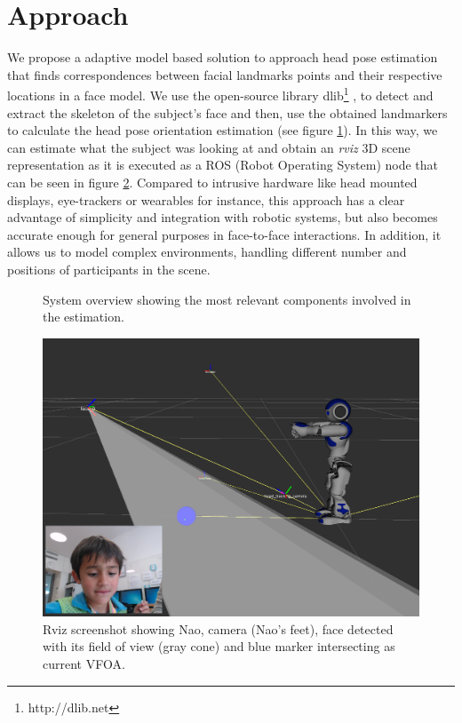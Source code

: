 \documentclass{sig-alternate}
\begin{document}
\section{Approach}

We propose a adaptive model based solution to approach head pose estimation that
finds correspondences between facial landmarks points and their respective
locations in a face model. We use the open-source library
dlib\footnote{http://dlib.net} \cite{dlib09}, to detect and extract the skeleton
of the subject's face and then, use the obtained landmarkers to calculate the
head pose orientation estimation (see figure \ref{system}). In this way, we can
estimate what the subject was looking at and obtain an \textit{rviz} 3D scene
representation as it is executed as a ROS (Robot Operating System) node that can
be seen in figure \ref{rviz}. Compared to intrusive hardware like head mounted
displays, eye-trackers or wearables for instance, this approach has a clear
advantage of simplicity and integration with robotic systems, but also becomes
accurate enough for general purposes in face-to-face interactions. In addition,
it allows us to model complex environments, handling different number and
positions of participants in the scene.

\begin{figure}[h!]
    \centering
    \caption{\small System overview showing the most relevant components involved in the estimation.}
    \label{system}
\end{figure}


\begin{figure}
    \centering
    \includegraphics[width=0.9\columnwidth]{rviz_camera}
    \caption{\small Rviz screenshot showing Nao, camera (Nao's feet), face detected with its field of view (gray cone) and blue marker intersecting as current VFOA.}
    \label{rviz}
\end{figure}
\end{document}
